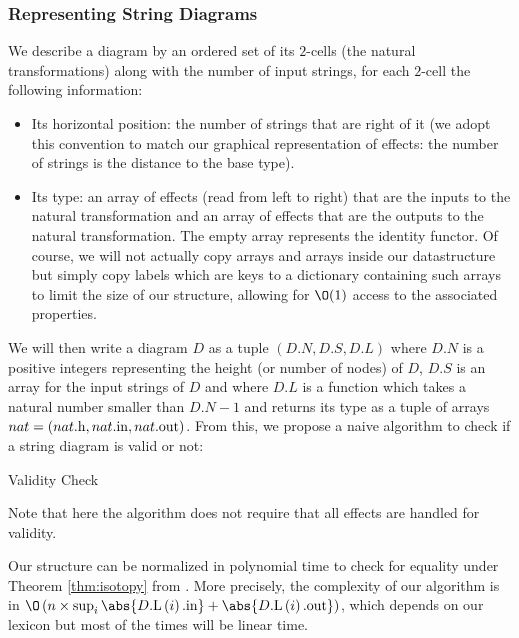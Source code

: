 \subsubsection{Representing String Diagrams}
We describe a diagram by an ordered set of its $2$-cells (the natural
transformations) along with the number of input strings, for each $2$-cell
the following information:
\begin{itemize}
	\item Its horizontal position: the number of strings that are right of it (we
	      adopt this convention to match our graphical representation of effects:
	      the number of strings is the distance to the base type).
	\item Its type: an array of effects (read from left to right) that are the
	      inputs to the natural transformation and an array of effects that are
	      the outputs to the natural transformation.
	      The empty array represents the identity functor.
	      Of course, we will not actually copy arrays and arrays inside our
	      datastructure but simply copy labels which are keys to a dictionary
	      containing such arrays to limit the size of our structure, allowing for
	      $\O(1)$ access to the associated properties.
\end{itemize}
We will then write a diagram $D$ as a tuple $\left( D.N, D.S, D.L \right)$
where $D.N$ is a positive integers representing the height (or number of nodes)
of $D$, $D.S$ is an array for the input strings of $D$ and where $D.L$ is a
function which takes a natural number smaller than $D.N - 1$ and returns its
type as a tuple of arrays
$nat = \left( nat\mathrm{.h}, nat\mathrm{.in}, nat\mathrm{.out} \right)$.
From this, we propose a naive algorithm to check if a string diagram is valid
or not:
\begin{algorithm}[h]
	\caption{Validity Check}
	\begin{algorithmic}
		\EndIf
		\EndFor
		\EndFunction
	\end{algorithmic}
\end{algorithm}
Note that here the algorithm does not require that all effects are handled for
validity.

\medskip

Our structure can be normalized in polynomial time to check for equality under
Theorem \ref{thm:isotopy} from \cite{delpeuchNormalizationPlanarString2022}.
More precisely, the complexity of our algorithm is in $\O\left( n \times
	\sup_{i} \abs{\dnin{\dlb{D}{i}}} + \abs{\dnout{\dlb{D}{i}}} \right)$,
which depends on our lexicon but most of the times will be linear time.

